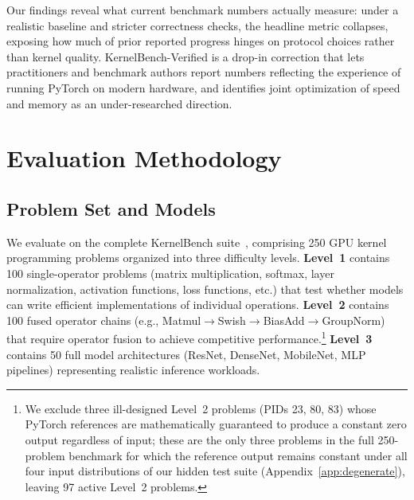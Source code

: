 \documentclass[]{fairmeta}
\begin{document}
Our findings reveal what current benchmark numbers actually measure: under a realistic baseline and stricter correctness checks, the headline metric collapses, exposing how much of prior reported progress hinges on protocol choices rather than kernel quality. KernelBench-Verified is a drop-in correction that lets practitioners and benchmark authors report numbers reflecting the experience of running PyTorch on modern hardware, and identifies joint optimization of speed and memory as an under-researched direction.


\section{Evaluation Methodology}
\label{sec:design}

\subsection{Problem Set and Models}

We evaluate on the complete KernelBench suite~\citep{kernelbench}, comprising 250 GPU kernel programming problems organized into three difficulty levels. \textbf{Level~1} contains 100 single-operator problems (matrix multiplication, softmax, layer normalization, activation functions, loss functions, etc.) that test whether models can write efficient implementations of individual operations. \textbf{Level~2} contains 100 fused operator chains (e.g., Matmul$\to$Swish$\to$BiasAdd$\to$GroupNorm) that require operator fusion to achieve competitive performance.\footnote{We exclude three ill-designed Level~2 problems (PIDs 23, 80, 83) whose PyTorch references are mathematically guaranteed to produce a constant zero output regardless of input; these are the only three problems in the full 250-problem benchmark for which the reference output remains constant under all four input distributions of our hidden test suite (Appendix~\ref{app:degenerate}), leaving 97 active Level~2 problems.} \textbf{Level~3} contains 50 full model architectures (ResNet, DenseNet, MobileNet, MLP pipelines) representing realistic inference workloads.
\end{document}
